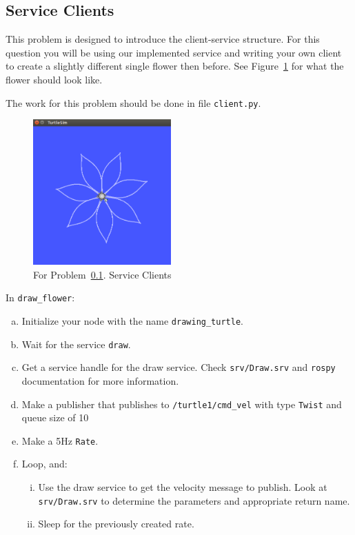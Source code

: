 \subsection{Service Clients}\label{p:client}

This problem is designed to introduce the client-service structure. For this question you will be
using our implemented service and writing your own client to create a slightly different single
flower then before. See Figure~\ref{fig:2} for what the flower should look like.

The work for this problem should be done in file \texttt{client.py}.

\begin{figure}[h]
  \centering
  \includegraphics[width=150pt]{figures/p1/problem3.png}
  \caption{For Problem~\ref{p:client}. Service Clients}
  \label{fig:2}
\end{figure}

In \texttt{draw\_flower}:
\begin{enumerate}[(a)]
  \item Initialize your node with the name \texttt{drawing\_turtle}.
  \item Wait for the service \texttt{draw}.

  \item Get a service handle for the draw service. Check \texttt{srv/Draw.srv} and \texttt{rospy}
    documentation for more information.

  \item Make a publisher that publishes to \texttt{/turtle1/cmd\_vel} with type \texttt{Twist} and
    queue size of 10
  \item Make a 5Hz \texttt{Rate}.

  \item Loop, and:
    \begin{enumerate}[i.]
      \item Use the draw service to get the velocity message to publish. Look at \texttt{srv/Draw.srv}
        to determine the parameters and appropriate return name.
      \item Sleep for the previously created rate.
    \end{enumerate}
\end{enumerate}

